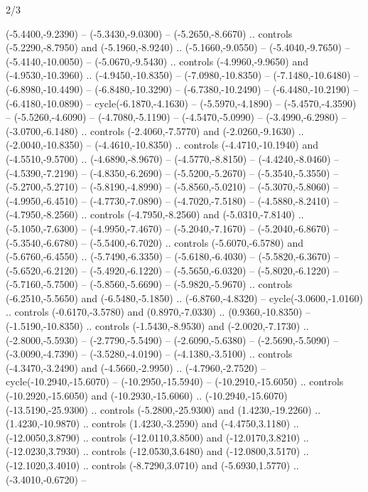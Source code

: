 \begin{flagdescription}{2/3}
\begin{scope}[xshift=0.5\flaglength,yshift=0.5\flagwidth,scale=\flagwidth/480]
\begin{scope}[y=0.80pt, x=0.80pt, yscale=-1,shift={(-450,-300)}]
  (-5.4400,-9.2390) -- (-5.3430,-9.0300) -- (-5.2650,-8.6670) .. controls
  (-5.2290,-8.7950) and (-5.1960,-8.9240) .. (-5.1660,-9.0550) --
  (-5.4040,-9.7650) -- (-5.4140,-10.0050) -- (-5.0670,-9.5430) .. controls
  (-4.9960,-9.9650) and (-4.9530,-10.3960) .. (-4.9450,-10.8350) --
  (-7.0980,-10.8350) -- (-7.1480,-10.6480) -- (-6.8980,-10.4490) --
  (-6.8480,-10.3290) -- (-6.7380,-10.2490) -- (-6.4480,-10.2190) --
  (-6.4180,-10.0890) -- cycle(-6.1870,-4.1630) -- (-5.5970,-4.1890) --
  (-5.4570,-4.3590) -- (-5.5260,-4.6090) -- (-4.7080,-5.1190) --
  (-4.5470,-5.0990) -- (-3.4990,-6.2980) -- (-3.0700,-6.1480) .. controls
  (-2.4060,-7.5770) and (-2.0260,-9.1630) .. (-2.0040,-10.8350) --
  (-4.4610,-10.8350) .. controls (-4.4710,-10.1940) and (-4.5510,-9.5700) ..
  (-4.6890,-8.9670) -- (-4.5770,-8.8150) -- (-4.4240,-8.0460) --
  (-4.5390,-7.2190) -- (-4.8350,-6.2690) -- (-5.5200,-5.2670) --
  (-5.3540,-5.3550) -- (-5.2700,-5.2710) -- (-5.8190,-4.8990) --
  (-5.8560,-5.0210) -- (-5.3070,-5.8060) -- (-4.9950,-6.4510) --
  (-4.7730,-7.0890) -- (-4.7020,-7.5180) -- (-4.5880,-8.2410) --
  (-4.7950,-8.2560) .. controls (-4.7950,-8.2560) and (-5.0310,-7.8140) ..
  (-5.1050,-7.6300) -- (-4.9950,-7.4670) -- (-5.2040,-7.1670) --
  (-5.2040,-6.8670) -- (-5.3540,-6.6780) -- (-5.5400,-6.7020) .. controls
  (-5.6070,-6.5780) and (-5.6760,-6.4550) .. (-5.7490,-6.3350) --
  (-5.6180,-6.4030) -- (-5.5820,-6.3670) -- (-5.6520,-6.2120) --
  (-5.4920,-6.1220) -- (-5.5650,-6.0320) -- (-5.8020,-6.1220) --
  (-5.7160,-5.7500) -- (-5.8560,-5.6690) -- (-5.9820,-5.9670) .. controls
  (-6.2510,-5.5650) and (-6.5480,-5.1850) .. (-6.8760,-4.8320) --
  cycle(-3.0600,-1.0160) .. controls (-0.6170,-3.5780) and (0.8970,-7.0330) ..
  (0.9360,-10.8350) -- (-1.5190,-10.8350) .. controls (-1.5430,-8.9530) and
  (-2.0020,-7.1730) .. (-2.8000,-5.5930) -- (-2.7790,-5.5490) --
  (-2.6090,-5.6380) -- (-2.5690,-5.5090) -- (-3.0090,-4.7390) --
  (-3.5280,-4.0190) -- (-4.1380,-3.5100) .. controls (-4.3470,-3.2490) and
  (-4.5660,-2.9950) .. (-4.7960,-2.7520) -- cycle(-10.2940,-15.6070) --
  (-10.2950,-15.5940) -- (-10.2910,-15.6050) .. controls (-10.2920,-15.6050) and
  (-10.2930,-15.6060) .. (-10.2940,-15.6070)(-13.5190,-25.9300) .. controls
  (-5.2800,-25.9300) and (1.4230,-19.2260) .. (1.4230,-10.9870) .. controls
  (1.4230,-3.2590) and (-4.4750,3.1180) .. (-12.0050,3.8790) .. controls
  (-12.0110,3.8500) and (-12.0170,3.8210) .. (-12.0230,3.7930) .. controls
  (-12.0530,3.6480) and (-12.0800,3.5170) .. (-12.1020,3.4010) .. controls
  (-8.7290,3.0710) and (-5.6930,1.5770) .. (-3.4010,-0.6720) --

\end{scope}
\end{scope}
\end{flagdescription}
